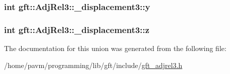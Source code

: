 \hypertarget{uniongft_1_1AdjRel3_1_1__displacement3_a5ebb63d19d067fb232fd980c28a8c465}{
\subsubsection[{y}]{\setlength{\rightskip}{0pt plus 5cm}int gft\-::\-Adj\-Rel3\-::\-\_\-displacement3\-::y}}\label{uniongft_1_1AdjRel3_1_1__displacement3_a5ebb63d19d067fb232fd980c28a8c465}
\hypertarget{uniongft_1_1AdjRel3_1_1__displacement3_ac047739172cb413ef913e594f09170c3}{
\subsubsection[{z}]{\setlength{\rightskip}{0pt plus 5cm}int gft\-::\-Adj\-Rel3\-::\-\_\-displacement3\-::z}}\label{uniongft_1_1AdjRel3_1_1__displacement3_ac047739172cb413ef913e594f09170c3}


The documentation for this union was generated from the following file\-:\begin{DoxyCompactItemize}
\item 
/home/pavm/programming/lib/gft/include/\hyperlink{gft__adjrel3_8h}{gft\-\_\-adjrel3.\-h}\end{DoxyCompactItemize}
